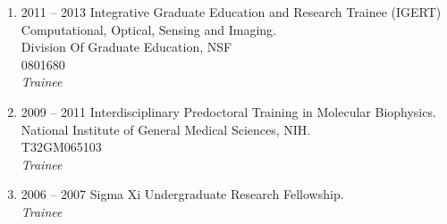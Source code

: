 \begin{enumerate}
\item 2011 -- 2013 
\hspace{8pt}
Integrative Graduate Education and Research Trainee (IGERT)\\
Computational, Optical, Sensing and Imaging.\\
Division Of Graduate Education, NSF \\
0801680\\
{\it Trainee}

\item 2009 -- 2011
\hspace{8pt}
Interdisciplinary Predoctoral Training in Molecular Biophysics. \\
National Institute of General Medical Sciences, NIH. \\
T32GM065103 \\
{\it Trainee}

\item 2006 -- 2007 
\hspace{8pt} 
Sigma Xi Undergraduate Research Fellowship. \\
{\it Trainee}

\end{enumerate}
